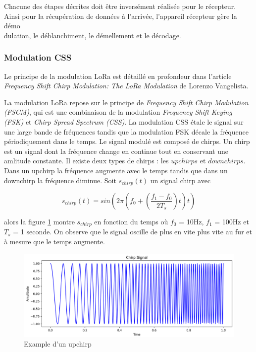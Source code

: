 \vspace{0.1cm}

Chacune des étapes décrites doit être inversément réalisée pour le récepteur. Ainsi pour la récupération de données à l'arrivée, l'appareil récepteur gère la démo \\ dulation, le déblanchiment, le démellement et le décodage.

\subsubsection{Modulation CSS}\label{css}

Le principe de la modulation LoRa est détaillé en profondeur dans l'article \textit{Frequency Shift Chirp Modulation: The LoRa Modulation} \cite{loraCSS} de Lorenzo Vangelista.

\vspace{0.1cm}

La modulation LoRa repose sur le principe de \textit{Frequency Shift Chirp Modulation (FSCM)}, qui est une combinaison de la modulation \textit{Frequency Shift Keying (FSK)} et \textit{Chirp Spread Spectrum (CSS)}.
La modulation CSS étale le signal sur une large bande de fréquences tandis que la modulation FSK décale la fréquence périodiquement dans le temps. Le signal modulé est composé de chirps. Un chirp est un signal dont la fréquence change en continue tout en conservant une amlitude constante. Il existe deux types de chirps : les $upchirps$ et $downchirps$.
Dans un upchirp la fréquence augmente avec le temps tandis que dans un downchirp la fréquence diminue. Soit $s_{chirp}(t)$ un signal chirp avec

\begin{equation}\label{eq3}
s_{chirp}(t) = sin(2\pi(f_0 + (\frac{f_1 - f_0}{2T_s})t)t)
\end{equation}

alors la figure \ref{term5} montre $s_{chirp}$ en fonction du temps où $f_0$ = 10Hz, $f_1$ = 100Hz et $T_s$ = 1 seconde. On observe que le signal oscille de plus en vite plus vite au fur et à mesure que le temps augmente.

\begin{figure}[h]
\centering

\includegraphics[scale=0.18]{images/CSSupchirp.png}
\caption{Example d'un upchirp}\label{term5}
\end{figure}

